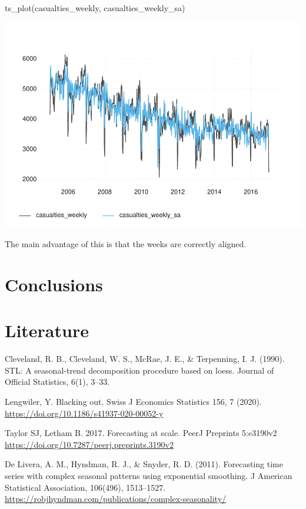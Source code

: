 \begin{Schunk}
\begin{Sinput}
ts_plot(casualties_weekly, casualties_weekly_sa)
\end{Sinput}

\includegraphics[width=1\linewidth]{overview_files/figure-latex/weekly-2} \end{Schunk}

The main advantage of this is that the weeks are correctly aligned.

\hypertarget{conclusions-1}{%
\section{Conclusions}\label{conclusions-1}}

\hypertarget{literature}{%
\section{Literature}\label{literature}}

Cleveland, R. B., Cleveland, W. S., McRae, J. E., \& Terpenning, I. J.
(1990). STL: A seasonal-trend decomposition procedure based on loess.
Journal of Official Statistics, 6(1), 3--33.

Lengwiler, Y. Blacking out. Swiss J Economics Statistics 156, 7 (2020).
\url{https://doi.org/10.1186/s41937-020-00052-y}

Taylor SJ, Letham B. 2017. Forecasting at scale. PeerJ Preprints
5:e3190v2 \url{https://doi.org/10.7287/peerj.preprints.3190v2}

De Livera, A. M., Hyndman, R. J., \& Snyder, R. D. (2011). Forecasting
time series with complex seasonal patterns using exponential smoothing.
J American Statistical Association, 106(496), 1513--1527.
\url{https://robjhyndman.com/publications/complex-seasonality/}

